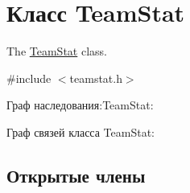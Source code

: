 \hypertarget{classTeamStat}{}\section{Класс Team\+Stat}
\label{classTeamStat}


The \hyperlink{classTeamStat}{Team\+Stat} class.  




{\ttfamily \#include $<$teamstat.\+h$>$}



Граф наследования\+:Team\+Stat\+:


Граф связей класса Team\+Stat\+:
\subsection*{Открытые члены}
